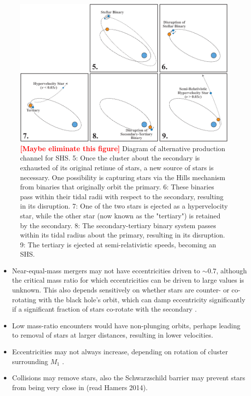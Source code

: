 \documentclass[a4paper,twocolumn]{emulateapj}
\newcommand{\colr}[1]{{\bf \textcolor{red}{[#1]}}}
\begin{document}
\begin{figure}
\centering\includegraphics[width=\linewidth,clip=true]{shs-diagram2}
\caption{\colr{Maybe eliminate this figure} Diagram of alternative production channel for SHS. 5: Once the cluster about the secondary is exhausted of its original retinue of stars, a new source of stars is necessary. One possibility is capturing stars via the Hills mechanism from binaries that originally orbit the primary. 6: These binaries pass within their tidal radii with respect to the secondary, resulting in its disruption. 7: One of the two stars is ejected as a hypervelocity star, while the other star (now known as the "tertiary") is retained by the secondary. 8: The secondary-tertiary binary system passes within its tidal radius about the primary, resulting in its disruption. 9: The tertiary is ejected at semi-relativistic speeds, becoming an SHS.}
\label{fig:diagram2}
\end{figure}

\begin{itemize}
\item Near-equal-mass mergers may not have eccentricities driven to $\sim 0.7$, although the critical mass ratio for which eccentricities can be driven to large values is unknown. This also depends sensitively on whether stars are counter- or co-rotating with the black hole's orbit, which can damp eccentricity significantly if a significant fraction of stars co-rotate with the secondary \citep{Sesana:2011a}.
\item Low mass-ratio encounters would have non-plunging orbits, perhaps leading to removal of stars at larger distances, resulting in lower velocities.
\item Eccentricities may not always increase, depending on rotation of cluster surrounding $M_{1}$ \citep{Dotti:2012a}.
\item Collisions may remove stars, also the Schwarzschild barrier may prevent stars from being very close in (read Hamers 2014).
\end{itemize}
\end{document}
